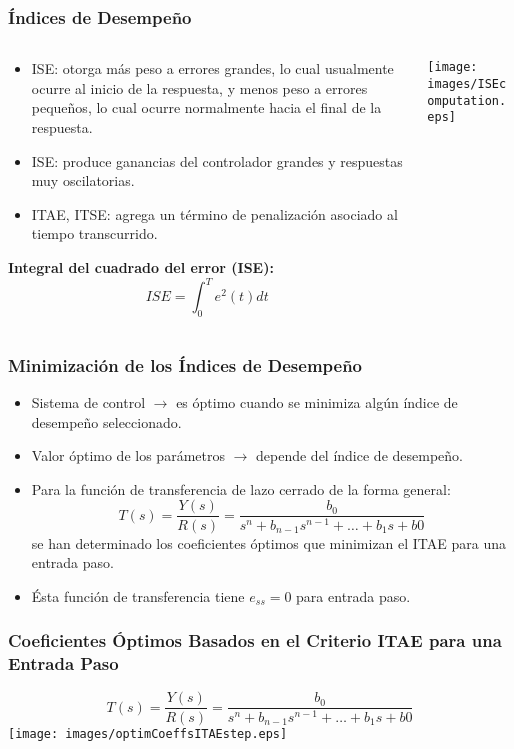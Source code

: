\documentclass[aspectratio=169,handout]{beamer}
\theoremstyle{definition}
\theoremstyle{plain}
\theoremstyle{remark}
\begin{document}
\begin{frame}[<+->]\frametitle{Índices de Desempeño}
\vspace*{3mm}
\begin{columns}
\begin{column}{0.7\textwidth}
	\begin{itemize}
		\item ISE: otorga más peso a errores grandes, lo cual usualmente ocurre al inicio de la respuesta, y menos peso a errores pequeños, lo cual ocurre normalmente hacia el final de la respuesta.
		\item ISE: produce ganancias del controlador grandes y respuestas muy oscilatorias.
		\item ITAE, ITSE: agrega un término de penalización asociado al tiempo transcurrido.
	\end{itemize}
	\textbf{Integral del cuadrado del error (ISE):}
	\begin{equation*}
		ISE = \int_0^T e^2(t) dt
	\end{equation*}
\end{column}	
\begin{column}{0.3\textwidth}
\texttt{[image: images/ISEcomputation.eps]}
\end{column}	
\end{columns}
\end{frame}

\begin{frame}[<+->]\frametitle{Minimización de los Índices de Desempeño}
\begin{itemize}
	\item Sistema de control $\rightarrow$ es óptimo cuando se minimiza algún índice de desempeño seleccionado.
	\item Valor óptimo de los parámetros $\rightarrow$ depende del índice de desempeño.
	\item Para la función de transferencia de lazo cerrado de la forma general:
	\begin{equation*}
		T(s) = \frac{Y(s)}{R(s)} = \frac{b_0}{s^n + b_{n-1} s^{n-1} + \dots + b_1 s + b0}
	\end{equation*}
	se han determinado los coeficientes óptimos que minimizan el ITAE para una entrada paso.
	\item Ésta función de transferencia tiene $e_{ss} = 0$ para entrada paso.
\end{itemize}
\end{frame}

\begin{frame}[<+->]\frametitle{Coeficientes Óptimos Basados en el Criterio ITAE para una Entrada Paso}
\centering
\begin{equation*}
	T(s) = \frac{Y(s)}{R(s)} = \frac{b_0}{s^n + b_{n-1} s^{n-1} + \dots + b_1 s + b0}
\end{equation*}
\vspace*{10mm}
\texttt{[image: images/optimCoeffsITAEstep.eps]}
\end{frame}
\end{document}
